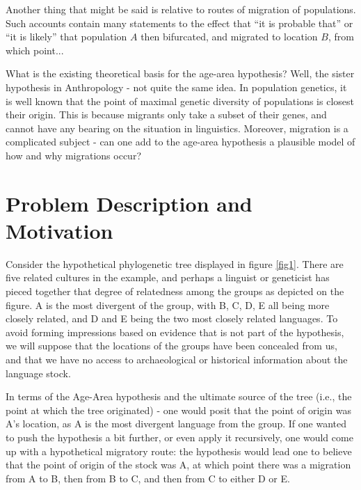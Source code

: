 \documentclass[11pt]{article}
\begin{document}
Another thing that might be said is relative to routes of migration of populations. Such accounts contain many statements to the effect that ``it is probable that'' or ``it is likely'' that population $A$ then bifurcated, and migrated to location $B$, from which point...

What is the existing theoretical basis for the age-area hypothesis? Well, the sister hypothesis in Anthropology - not quite the same idea. In population genetics, it is well known that
the point of maximal genetic diversity of populations is closest their origin. This is because migrants only take a subset of their genes, and cannot have any bearing on the situation
in linguistics. Moreover, migration is a complicated subject - can one add to the age-area hypothesis a plausible model of how and why migrations occur?

\section{Problem Description and Motivation}

Consider the hypothetical phylogenetic tree displayed in figure \ref{fig1}. There are five related cultures in the example, and perhaps a linguist or geneticist has pieced together that degree of relatedness among the groups as depicted on the figure. A is the most divergent of the group, with B, C, D, E all being more closely related, and D and E being the two most closely
related languages. To avoid forming impressions based on evidence that is not part of the hypothesis, we will suppose that the locations of the
groups have been concealed from us, and that we have no access to archaeological or historical information about the language stock.

In terms of the Age-Area hypothesis and the ultimate source of the tree (i.e., the point at which the tree originated) - one would posit that the point of origin was A's location, as A is the most divergent language from the group. If one wanted to push the hypothesis a bit further, or even apply it recursively, one would come up with a hypothetical migratory route: the hypothesis would lead one to believe that the point of origin of the stock was A, at which point there was a migration from A to B, then from B to C, and then from C to either D or E.
\end{document}
